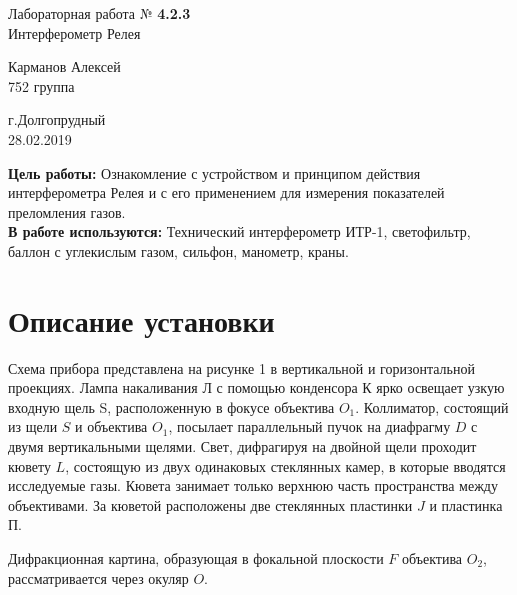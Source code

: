 \documentclass[12pt]{article}
\begin{document}
\begin{titlepage}
\begin{center}
\huge{Лабораторная работа № \textbf{4.2.3}}\\[1cm]\LARGE {Интерферометр Релея\\[7 cm]}
\end{center}

\begin{flushright}
\Large{Карманов Алексей\\752 группа}\\[9 cm]
\end{flushright}
\begin{center}
г.Долгопрудный\\
28.02.2019
\end{center}
\end{titlepage}
\fancyhead[L]
\indent \textbf{Цель работы:} Ознакомление с устройством и принципом действия интерферометра Релея и с его применением для измерения показателей преломления газов.\\[0.75 cm]
\indent \textbf{В работе используются:} Технический интерферометр ИТР-1, светофильтр, баллон с углекислым газом, сильфон, манометр, краны.\\
	\section{Описание установки}
\hspace{0.5 cm} Схема прибора представлена на рисунке 1 в вертикальной и горизонтальной проекциях. Лампа накаливания Л с помощью конденсора К ярко освещает узкую входную щель S, расположенную в фокусе объектива $O_1$. Коллиматор, состоящий из щели $S$ и объектива $O_1$, посылает параллельный пучок на диафрагму $D$ с двумя вертикальными щелями. Свет, дифрагируя на двойной щели проходит кювету $L$, состоящую из двух одинаковых стеклянных камер, в которые вводятся исследуемые газы. Кювета занимает только верхнюю часть пространства между объективами. За кюветой расположены две стеклянных пластинки $J$ и пластинка П. 
	
	Дифракционная картина, образующая в фокальной плоскости $F$ объектива $O_2$, рассматривается через окуляр $O$.
	
\end{document}
